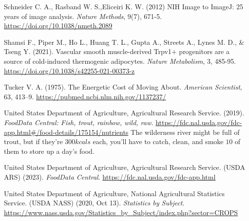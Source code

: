 \documentclass[11pt,letter]{article}
\begin{document}
\begin{thebibliography}{99}
%
Schneider  C. A., Rasband W. S.,Eliceiri K. W.
(2012)
NIH Image to ImageJ: 25 years of image analysis.
\textit{Nature Methods},
9(7), 671-5.
\url{https://doi.org/10.1038/nmeth.2089}

Shamsi F., Piper M., Ho L., Huang T. L., Gupta A., Streets A., Lynes M. D., \& Tseng Y. 
 (2021).
Vascular smooth muscle-derived Trpv1+ progenitors are a source of cold-induced thermogenic adipocytes.
\textit{Nature Metabolism},
3, 485-95.
\url{https://doi.org/10.1038/s42255-021-00373-z}

Tucker V. A. 
(1975).
The Energetic Cost of Moving About.
\textit{American Scientist},
63, 413--9.
\url{https://pubmed.ncbi.nlm.nih.gov/1137237/}

United States Department of Agriculture, Agricultural Research Service.
(2019).
\textit{FoodData Central: Fish, trout, rainbow, wild, raw.}
\url{https://fdc.nal.usda.gov/fdc-app.html#/food-details/175154/nutrients}
The wilderness river might be full of trout, but if they're $300kcals$ each, you'll have to catch, clean, and smoke $10$ of them to store up a day's food.

United States Department of Agriculture, Agricultural Research Service. (USDA ARS)
(2023).
\textit{FoodData Central}. 
\url{https://fdc.nal.usda.gov/fdc-app.html}

United States Department of Agriculture, National Agricultural Statistics Service. (USDA NASS)
(2020, Oct 13).
\textit{Statistics by Subject}.
\url{https://www.nass.usda.gov/Statistics_by_Subject/index.php?sector=CROPS}








\end{thebibliography}
\end{document}
